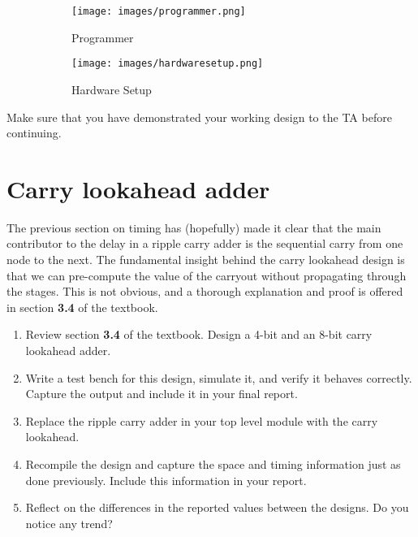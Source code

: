 \documentclass[12pt]{betterjournal}
\begin{document}
\begin{figure}[htbp!]
    \centering
    \begin{subfigure}{0.45\textwidth}    
    \texttt{[image: images/programmer.png]}
    \caption{Programmer}
    \label{fig:programmer}
    \end{subfigure}
    \hfill
    \begin{subfigure}{0.45\textwidth}
        \texttt{[image: images/hardwaresetup.png]}
        \caption{Hardware Setup}
        \label{fig:hardwaresetup}
    \end{subfigure}
    \caption{}
\end{figure}

\hfill\break

\begin{important}[frametitle={TA Checkoff}]
    Make sure that you have demonstrated your working design to the TA before continuing.
\end{important}



\section{Carry lookahead adder}
The previous section on timing has (hopefully) made it clear that the main contributor to the delay in a ripple carry adder is the sequential carry from one node to the next. The fundamental insight behind the carry lookahead design is that we can pre-compute the value of the carryout without propagating through the stages. This is not obvious, and a thorough explanation and proof is offered in section \textbf{3.4} of the textbook.
\hfill\break
\begin{question}
\begin{enumerate}
    \item Review section \textbf{3.4} of the textbook. Design a 4-bit and an 8-bit carry lookahead adder.
    \item Write a test bench for this design, simulate it, and verify it behaves correctly. Capture the output and include it in your final report.
    \item Replace the ripple carry adder in your top level module with the carry lookahead.
    \item Recompile the design and capture the space and timing information just as done previously. Include this information in your report.
    \item Reflect on the differences in the reported values between the designs. Do you notice any trend?
\end{enumerate}
    
\end{question}
\end{document}
